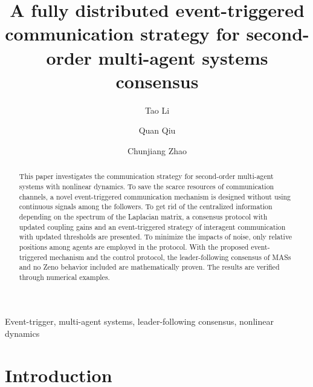 \documentclass[review]{elsarticle}
\begin{document}
\begin{frontmatter}

\title{A fully distributed event-triggered communication strategy for second-order multi-agent systems consensus}




\author[mymainaddress]{Tao Li}


\author[mymainaddress]{Quan Qiu}


\author[SecAddress]{Chunjiang Zhao}


\address[mymainaddress]{Beijing Research Center of Intelligent Equipment for Agriculture, Beijing, China}
\address[SecAddress]{National Engineering Research Center for Information Technology in Agriculture, Beijing, China}




\begin{abstract}
	This paper investigates the communication strategy for second-order multi-agent systems with nonlinear dynamics. To save the scarce resources of communication channels, a novel event-triggered communication mechanism is designed without using continuous signals among the followers. To get rid of the centralized information depending on the spectrum of the Laplacian matrix, a consensus protocol with updated coupling gains and an event-triggered strategy of interagent communication with updated thresholds are presented. 
	To minimize the impacts of noise, only relative positions among agents are employed in the protocol.
	With the proposed event-triggered mechanism and the control protocol, the leader-following consensus of MASs and no Zeno behavior included are mathematically proven. The results are verified through numerical examples. 
\end{abstract}
\begin{keyword}
 Event-trigger, multi-agent systems, leader-following consensus, nonlinear dynamics
\end{keyword}

\end{frontmatter}


\section{Introduction}
\end{document}
